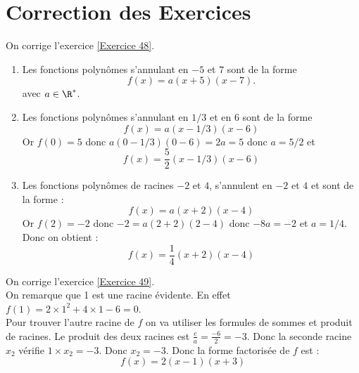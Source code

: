 \documentclass[12pt,fleqn]{report} %
\begin{document}
\chapter{Correction des Exercices}
\begin{correction}
	On corrige l'exercice \ref{Exercice 48}.\\
	\begin{enumerate}
		\item Les fonctions polynômes s'annulant en $-5$ et $7$ sont de la forme \[
		f(x) = a(x+5)(x-7).
		\] avec $a\in \R^*$.
		\item Les fonctions polynômes s'annulant en $1/3$ et en $6$ sont de la forme \[
		f(x)  = a (x - 1/3)(x -6)
		\]
		Or $f(0) = 5$ donc $a(0 - 1/3)(0-6) = 2a = 5$ donc $a = 5/2$ et 
		\[
		f(x) = \frac{5}{2}(x-1/3)(x-6)
		\]
		\item Les fonctions polynômes de racines $-2$ et $4$, s'annulent en $-2$ et $4$ et sont de la forme : 
		\[
		f(x) = a (x + 2)(x-4)
		\]
		Or $f(2) = -2$ donc $-2 = a(2 + 2)(2 - 4)$ donc $-8a = -2$ et $a = 1/4$. Donc on obtient : 
		\[
		f(x) = \frac{1}{4} (x+ 2)(x-4)
		\]
	\end{enumerate}
\end{correction}


\begin{correction}
	On corrige l'exercice \ref{Exercice 49}.\\
	On remarque que 1 est une racine évidente. En effet $f(1) = 2\times 1^2 + 4 \times 1 -6 = 0$. \\
	Pour trouver l'autre racine de $f$ on va utiliser les formules de sommes et produit de racines. Le produit des deux racines est $\frac{c}{a} = \frac{-6}{2} = -3$. Donc la seconde racine $x_2$ vérifie $1 \times x_2 = -3$. Donc $x_2 = -3$. Donc la forme factorisée de $f$ est :
	\[
	f(x) = 2(x-1)(x+3)
	\]
\end{correction}
\end{document}
